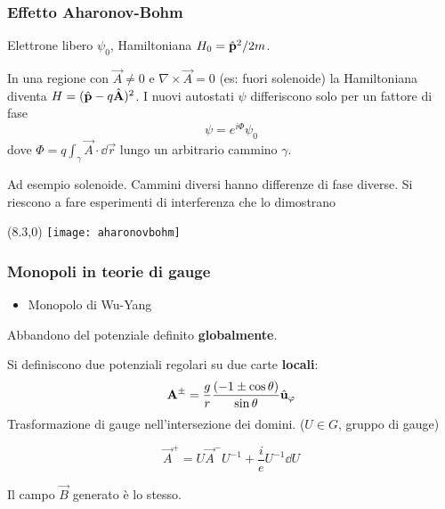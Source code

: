 \begin{frame}\frametitle{Effetto Aharonov-Bohm}
Elettrone libero $\psi_0$, Hamiltoniana $H_0 = \hat{\mathbf{p}}^2/2m$. \bigskip

In una regione con $\vec A \neq 0$ e $\nabla \times \vec A = 0 $ (es: fuori solenoide)
la Hamiltoniana diventa $H = (\hat{\mathbf{p}} - q \hat{\mathbf{A}})^2$.
I nuovi autostati $\psi$ differiscono solo per un fattore di fase
$$
   \psi = e^{i\Phi}\psi_0
$$
dove $\Phi = q \int _\gamma \vec A \cdot \dd \vec r$ lungo un arbitrario cammino $\gamma$.\\ \bigskip

Ad esempio solenoide. Cammini diversi hanno differenze di fase diverse. Si riescono a fare
esperimenti di interferenza che lo dimostrano
\begin{textblock}{10}(8.3,0){
   \texttt{[image: aharonovbohm]}
}\end{textblock}

\end{frame}


\begin{frame}
\frametitle{Monopoli in teorie di gauge}
\begin{itemize}
\item Monopolo di Wu-Yang
\end{itemize}
Abbandono del potenziale definito \textbf{globalmente}.

Si definiscono due potenziali regolari su due carte \textbf{locali}:
$$
   \mathbf{A} ^\pm = \frac{g}{r}\frac{(-1 \pm \cos\theta)}{\sin\theta} \hat{\mathbf{u}} _\varphi
$$
Trasformazione di gauge nell'intersezione dei domini.
($U \in G$, gruppo di gauge)

$$
  \vec A^+ = U \vec A^- U ^{-1} + \frac{i}{e} U ^{-1} \dd U
$$

Il campo $\vec B$ generato è lo stesso.
\end{frame}

